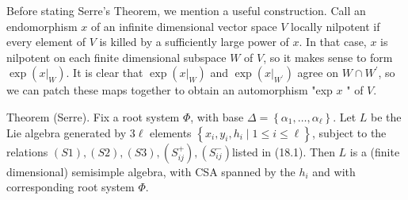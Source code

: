 \documentclass[10pt]{article}
\begin{document}
Before stating Serre's Theorem, we mention a useful construction. Call an endomorphism $x$ of an infinite dimensional vector space $V$ locally nilpotent if every element of $V$ is killed by a sufficiently large power of $x$. In that case, $x$ is nilpotent on each finite dimensional subspace $W$ of $V$, so it makes sense to form $\exp \left(\left.x\right|_{W}\right)$. It is clear that $\exp \left(\left.x\right|_{W}\right)$ and $\exp \left(\left.x\right|_{W^{\prime}}\right)$ agree on $W \cap W^{\prime}$, so we can patch these maps together to obtain an automorphism "exp $x$ " of $V$.

Theorem (Serre). Fix a root system $\Phi$, with base $\Delta=\left\{\alpha_{1}, \ldots, \alpha_{\ell}\right\}$. Let $L$ be the Lie algebra generated by $3 \ell$ elements $\left\{x_{i}, y_{i}, h_{i} \mid 1 \leq i \leq \ell\right\}$, subject to the relations $(S 1),(S 2),(S 3),\left(S_{i j}^{+}\right),\left(S_{i j}^{-}\right)$listed in (18.1). Then $L$ is a (finite dimensional) semisimple algebra, with CSA spanned by the $h_{i}$ and with corresponding root system $\Phi$.
\end{document}
